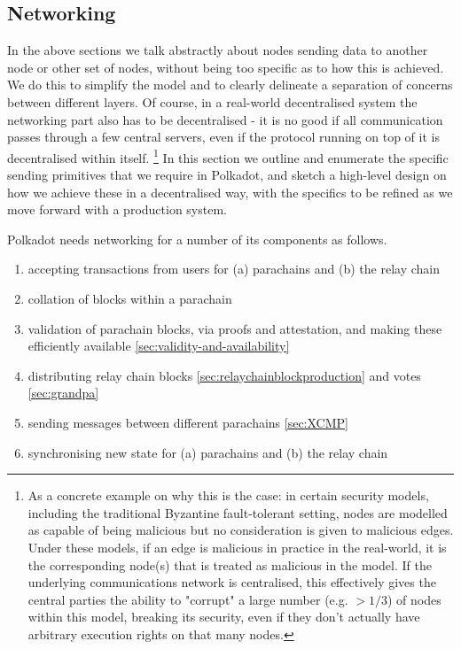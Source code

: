 \subsection{Networking}\label{sec:networking}

In the above sections we talk abstractly about nodes sending data to another
node or other set of nodes, without being too specific as to how this is
achieved. We do this to simplify the model and to clearly delineate a
separation of concerns between different layers. Of course, in a real-world
decentralised system the networking part also has to be decentralised - it is
no good if all communication passes through a few central servers, even if the
protocol running on top of it is decentralised within itself. \footnote{As a
concrete example on why this is the case: in certain security models, including
the traditional Byzantine fault-tolerant setting, nodes are modelled as capable
of being malicious but no consideration is given to malicious edges. Under
these models, if an edge is malicious in practice in the real-world, it is the
corresponding node(s) that is treated as malicious in the model. If the
underlying communications network is centralised, this effectively gives the
central parties the ability to "corrupt" a large number (e.g. $> 1/3$) of nodes
within this model, breaking its security, even if they don't actually have
arbitrary execution rights on that many nodes.} In this section we outline and
enumerate the specific sending primitives that we require in Polkadot, and
sketch a high-level design on how we achieve these in a decentralised way, with
the specifics to be refined as we move forward with a production system.

Polkadot needs networking for a number of its components as follows.
\begin{enumerate}
\item accepting transactions from users for (a) parachains and (b) the relay chain
\item collation of blocks within a parachain
\item validation of parachain blocks, via proofs and attestation, and making these efficiently available \ref{sec:validity-and-availability}
\item distributing relay chain blocks \ref{sec:relaychainblockproduction} and votes \ref{sec:grandpa}
\item sending messages between different parachains \ref{sec:XCMP}
\item synchronising new state for (a) parachains and (b) the relay chain
\end{enumerate}

